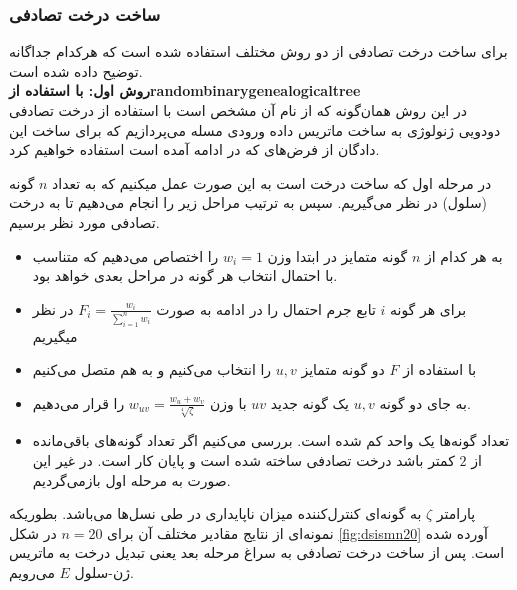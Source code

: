 \subsubsection{ساخت درخت تصادفی}
برای ساخت درخت تصادفی از دو روش مختلف استفاده شده است که هرکدام جداگانه توضیح داده شده است.
\vspace{20pt}
\\
\textbf{روش اول: با استفاده از\gls{randombinarygenealogicaltree}}
\\
در این روش همان‌گونه که از نام آن مشخص است با استفاده از درخت تصادفی دودویی ژنولوژی به ساخت ماتریس داده ورودی مسله می‌پردازیم که برای ساخت این دادگان از فرض‌های که در ادامه آمده است استفاده خواهیم کرد. 

در مرحله اول که ساخت درخت است به این صورت عمل میکنیم که به تعداد $n$ گونه (سلول) در نظر می‌گیریم. سپس به ترتیب مراحل زیر را انجام می‌دهیم تا به درخت تصادفی مورد نظر برسیم.
\begin{itemize}
	\item به هر کدام از $n$ گونه متمایز در ابتدا وزن $w_i=1$ را اختصاص می‌دهیم که متناسب با احتمال انتخاب هر گونه در مراحل بعدی خواهد بود.
	\item برای هر گونه ‌$i$ تابع جرم احتمال را در ادامه به صورت $F_i=\frac{w_i}{\sum_{i=1}^{n}w_i}$ در نظر میگیریم
	\item با استفاده از $F$ دو گونه متمایز $u, v$ را انتخاب می‌کنیم و به هم متصل می‌کنیم
	\item به جای دو گونه $u, v$ یک گونه جدید $uv$ با وزن $w_{uv}=\frac{w_u+w_v}{\sqrt[4]{\zeta}}$ را قرار می‌دهیم.
	\item تعداد گونه‌ها یک واحد کم شده است. بررسی می‌کنیم اگر تعداد گونه‌های باقی‌مانده از $2$ کمتر باشد درخت تصادفی ساخته شده است و پایان کار است. در غیر این صورت به مرحله اول بازمی‌گردیم.
\end{itemize}
پارامتر $\zeta$ به گونه‌ای کنترل‌کننده میزان ناپایداری در طی نسل‌ها می‌باشد. بطوریکه نمونه‌ای از نتایج مقادیر مختلف آن برای $n=20$ در شکل \ref{fig:dsismn20} آورده شده است. پس از ساخت درخت تصادفی به سراغ مرحله بعد یعنی تبدیل درخت به ماتریس ژن-سلول $E$ می‌رویم.
